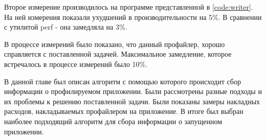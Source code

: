     Второе измерение производилось на программе представленной в \ref{code:writer}. На ней измерения показали ухудшений в производительности на 5\%. В сравнении с утилитой perf - она замедляла на 3\%.
    
    В процессе измерений было показано, что данный профайлер, хорошо справляется с поставленной задачей. Максимальное замедление, которое встречалось в процессе измерений было 10\%. 
        
\chapterconclusion
	В данной главе был описан алгоритм с помощью которого происходит сбор информации о профилируемом приложении. Были рассмотрены разные подходы и их проблемы к решению поставленной задачи. Были показаны замеры накладных расходов, накладываемых профайлером на приложение. В итоге был выбран наиболее подходящий алгоритм для сбора информации о запущенном приложении.
